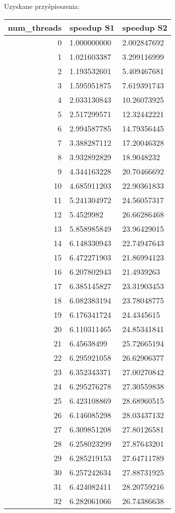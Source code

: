 \documentclass[a4paper,12pt]{scrartcl}
\begin{document}
Uzyskane przyśpieszenia:

\begin{tabular}{|r|l|l|}
num\_threads & speedup S1 & speedup S2 \\  \hline 
0  & 1.000000000 & 2.002847692  \\ \hline 
1  & 1.021603387 & 3.299116999  \\ \hline 
2  & 1.193532601 & 5.409467681  \\ \hline
3  & 1.595951875 & 7.619391743  \\ \hline
4  & 2.033130843 & 10.26073925  \\ \hline
5  & 2.517299571 & 12.32442221  \\ \hline
6  & 2.994587785 & 14.79356445  \\ \hline
7  & 3.388287112 & 17.20046328  \\ \hline
8  & 3.932892829 & 18.9048232  \\ \hline
9  & 4.344163228 & 20.70466692  \\ \hline
10 & 4.685911203 & 22.90361833  \\ \hline
11 & 5.241304972 & 24.56057317  \\ \hline
12 & 5.4529982 & 26.66286468  \\ \hline
13 & 5.858985849 & 23.96429015  \\ \hline
14 & 6.148330943 & 22.74947643  \\ \hline
15 & 6.472271903 & 21.86994123  \\ \hline
16 & 6.207802943 & 21.4939263  \\ \hline
17 & 6.385145827 & 23.31903453  \\ \hline
18 & 6.082383194 & 23.78048775  \\ \hline
19 & 6.176341724 & 24.4345615  \\ \hline
20 & 6.110311465 & 24.85341841  \\ \hline
21 & 6.45638499 & 25.72665194  \\ \hline
22 & 6.295921058 & 26.62906377  \\ \hline
23 & 6.352343371 & 27.00270842  \\ \hline
24 & 6.295276278 & 27.30559838  \\ \hline
25 & 6.423108869 & 28.68960515  \\ \hline
26 & 6.146085298 & 28.03437132  \\ \hline
27 & 6.309851208 & 27.80126581  \\ \hline
28 & 6.258023299 & 27.87643201  \\ \hline
29 & 6.285219153 & 27.64711789  \\ \hline
30 & 6.257242634 & 27.88731925  \\ \hline
31 & 6.424082411 & 28.20759216  \\ \hline
32 & 6.282061066 & 26.74386638  \\ \hline
\end{tabular} 
\end{document}
